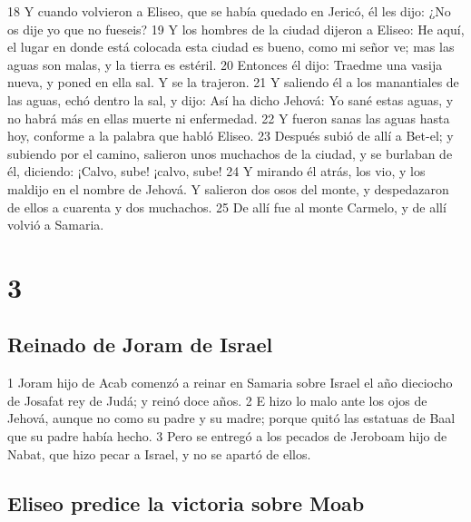 18 Y cuando volvieron a Eliseo, que se había quedado en Jericó, él les dijo: ¿No os dije yo que no fueseis?
19 Y los hombres de la ciudad dijeron a Eliseo: He aquí, el lugar en donde está colocada esta ciudad es bueno, como mi señor ve; mas las aguas son malas, y la tierra es estéril.
20 Entonces él dijo: Traedme una vasija nueva, y poned en ella sal. Y se la trajeron.
21 Y saliendo él a los manantiales de las aguas, echó dentro la sal, y dijo: Así ha dicho Jehová: Yo sané estas aguas, y no habrá más en ellas muerte ni enfermedad.
22 Y fueron sanas las aguas hasta hoy, conforme a la palabra que habló Eliseo.
23 Después subió de allí a Bet-el; y subiendo por el camino, salieron unos muchachos de la ciudad, y se burlaban de él, diciendo: ¡Calvo, sube! ¡calvo, sube!
24 Y mirando él atrás, los vio, y los maldijo en el nombre de Jehová. Y salieron dos osos del monte, y despedazaron de ellos a cuarenta y dos muchachos.
25 De allí fue al monte Carmelo, y de allí volvió a Samaria.

\chapter{3}

\section*{Reinado de Joram de Israel}


1 Joram hijo de Acab comenzó a reinar en Samaria sobre Israel el año dieciocho de Josafat rey de Judá; y reinó doce años.
2 E hizo lo malo ante los ojos de Jehová, aunque no como su padre y su madre; porque quitó las estatuas de Baal que su padre había hecho.
3 Pero se entregó a los pecados de Jeroboam hijo de Nabat, que hizo pecar a Israel, y no se apartó de ellos.
\section*{Eliseo predice la victoria sobre Moab}

